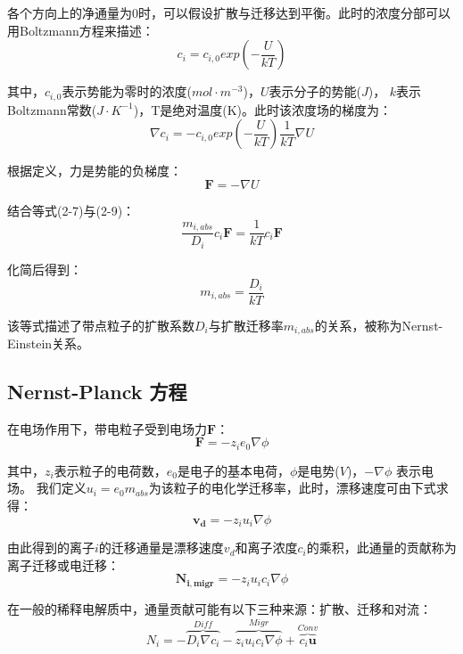各个方向上的净通量为$0$时，可以假设扩散与迁移达到平衡。此时的浓度分部可以用Boltzmann方程来描述：
\begin{equation}
    c_i=c_{i,0}exp(-\frac{U}{kT})
\end{equation}

其中，$c_{i,0}$表示势能为零时的浓度($mol\cdot{m^{-3}}$)，$U$表示分子的势能($J$)，
$k$表示Boltzmann常数($J\cdot{K^{-1}}$)，T是绝对温度(K)。此时该浓度场的梯度为：
\begin{equation}
    \nabla{c_i}=-c_{i,0}exp(-\frac{U}{kT})\frac{1}{kT}\nabla{U}
\end{equation}

根据定义，力是势能的负梯度：
\begin{equation}
    \mathbf{F}=-\nabla{U}
\end{equation}

结合等式(2-7)与(2-9)：
\begin{equation}
    \frac{m_{i,abs}}{D_i}c_i\mathbf{F}=\frac{1}{kT}c_i\mathbf{F}
\end{equation}

化简后得到：
\begin{equation}
    m_{i,abs}=\frac{D_i}{kT}
    \label{Nernst-Einstein}
\end{equation}

该等式描述了带点粒子的扩散系数$D_i$与扩散迁移率$m_{i,abs}$的关系，被称为Nernst-Einstein关系\cite{Mehrer2007,CONWAY1972250}。
\subsection{Nernst-Planck 方程}
在电场作用下，带电粒子受到电场力$\mathbf{F}$：
\begin{equation}
    \mathbf{F}=-z_ie_0\nabla\phi
\end{equation}

其中，$z_i$表示粒子的电荷数，$e_0$是电子的基本电荷，$\phi$是电势($V$)，$−\nabla{\phi}$ 表示电场。
我们定义$u_i=e_0m_{abs}$为该粒子的电化学迁移率，此时，漂移速度可由下式求得：
\begin{equation}
   \mathbf{v_d}=-z_iu_i\nabla\phi
\end{equation}

由此得到的离子$i$的迁移通量是漂移速度$v_d$和离子浓度$c_i$的乘积，此通量的贡献称为离子迁移或电迁移：
\begin{equation}
    \mathbf{N_{i,migr}}=-z_iu_ic_i\nabla\phi
\end{equation}

在一般的稀释电解质中，通量贡献可能有以下三种来源：扩散、迁移和对流：
\begin{equation}
    N_i=-\overbrace{D_i\nabla{c_i}}^{Diff}-\overbrace{z_iu_ic_i\nabla\phi}^{Migr}+\overbrace{c_i\mathbf{u}}^{Conv}
\end{equation}

